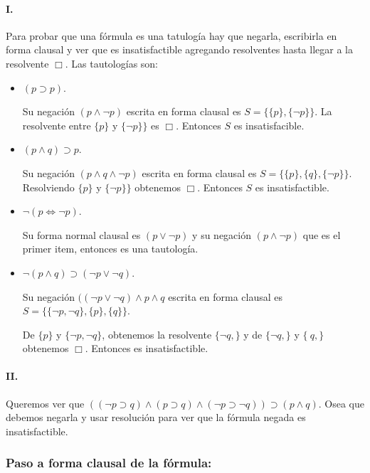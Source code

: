 \documentclass[10pt,a4paper]{article}
\begin{document}
\paragraph{I.} Para probar que una fórmula es una tatulogía hay que negarla, escribirla en forma clausal y ver que es insatisfactible agregando resolventes hasta llegar a la resolvente $\Box$. Las tautologías son:
\begin{itemize}
\item $(p \supset p)$. 

Su negación $(p \land \lnot p)$ escrita en forma clausal es $S = \{\{p\},\{\lnot p\}\}$. La resolvente entre $\{p\}$ y $\{\lnot p\}\}$ es $\Box$. Entonces $S$ es insatisfacible.

\item $(p \land q) \supset p$.

Su negación $(p \land q \land \lnot p)$ escrita en forma clausal es $S = \{\{p\},\{q\},\{\lnot p\}\} $. Resolviendo $\{p\}$ y $\{\lnot p\}\}$ obtenemos $\Box$. Entonces $S$ es insatisfactible.

\item $\lnot(p \iff \lnot p)$.

Su forma normal clausal es $(p \lor \lnot p)$ y su negación $(p \land \lnot p)$ que es el primer item, entonces es una tautología.

\item $\lnot(p\land q) \supset (\lnot p \lor \lnot q) $.

Su negación $((\lnot p \lor \lnot q)\land p \land q$ escrita en forma clausal es $S = \{\{\lnot p,\lnot q\},\{p\},\{q\}\}$.

De $\{p\}$ y $\{\lnot p,\lnot q\}$, obtenemos la resolvente $\{\lnot q,\}$ y de $\{\lnot q,\}$ y $\{\ q,\}$ obtenemos $\Box$. Entonces es insatisfactible.
    \end{itemize}

\paragraph{II.} Queremos ver que
$ ((\lnot p \supset q) \land (p \supset q) \land (\lnot p \supset \lnot q)) \supset  (p \land q)$. Osea que debemos negarla y usar resolución para ver que la fórmula negada es insatisfactible.

\subsubsection*{Paso a forma clausal de la fórmula:}
\end{document}
